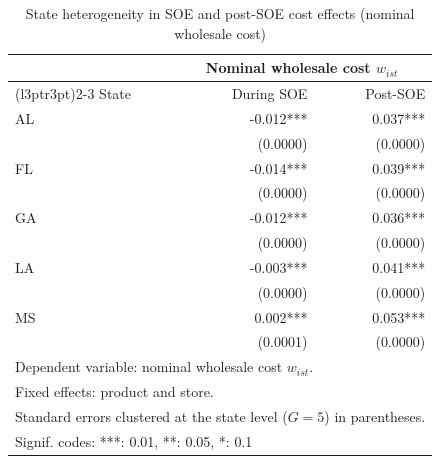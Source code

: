 \begin{table}[!h]
\centering
\caption{\label{tab:tab:cost_reg_state_heterog}State heterogeneity in SOE and post-SOE cost effects (nominal wholesale cost)}
\centering
\begin{tabular}[t]{lrr}
\toprule
\multicolumn{1}{c}{ } & \multicolumn{2}{c}{Nominal wholesale cost $w_{ist}$} \\
\cmidrule(l{3pt}r{3pt}){2-3}
State & During SOE & Post-SOE\\
\midrule
AL & -0.012*** & 0.037***\\
 & (0.0000) & (0.0000)\\
FL & -0.014*** & 0.039***\\
 & (0.0000) & (0.0000)\\
GA & -0.012*** & 0.036***\\
\addlinespace
 & (0.0000) & (0.0000)\\
LA & -0.003*** & 0.041***\\
 & (0.0000) & (0.0000)\\
MS & 0.002*** & 0.053***\\
 & (0.0001) & (0.0000)\\
\bottomrule
\multicolumn{3}{l}{\rule{0pt}{1em}Dependent variable: nominal wholesale cost $w_{ist}$.}\\
\multicolumn{3}{l}{\rule{0pt}{1em}Fixed effects: product and store.}\\
\multicolumn{3}{l}{\rule{0pt}{1em}Standard errors clustered at the state level ($G = 5$) in parentheses.}\\
\multicolumn{3}{l}{\rule{0pt}{1em}Signif. codes: ***: 0.01, **: 0.05, *: 0.1}\\
\end{tabular}
\end{table}
